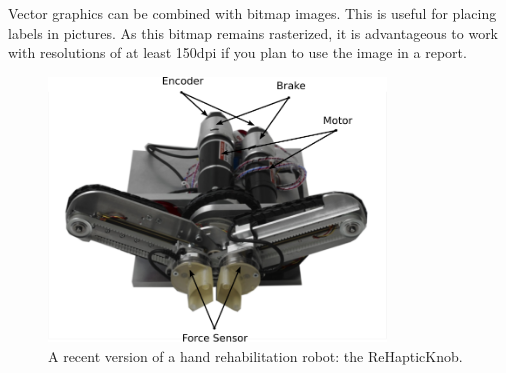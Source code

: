 Vector graphics can be combined with bitmap images. This is useful for placing labels in pictures. As this bitmap remains rasterized, it is advantageous to work with resolutions of at least 150dpi if you plan to use the image in a report. 

\newpage

\begin{figure}[h]
   \centering
   \includegraphics[width=0.8\textwidth]{pics/ReHapticKnob_edit.pdf}
   \caption{A recent version of a hand rehabilitation robot: the ReHapticKnob.}
   \label{p:rehapticknob}
\end{figure}

\vspace{10cm}
